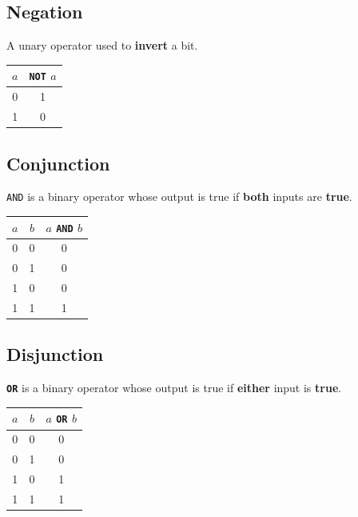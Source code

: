 \documentclass{report}
\newcommand{\keywordinline}[1]{\textcolor[rgb]{0.00,0.50,0.00}{\textbf{\texttt{#1}}}}
\begin{document}
\subsection{Negation}
A unary operator used to \textbf{invert} a bit.
\begin{table}[H]
    \centering
    \begin{tabular}{c c}
        \toprule
        \textbf{\(a\)} & \keywordinline{NOT} \(a\) \\
        \midrule
        0              & 1                         \\
        1              & 0                         \\
        \bottomrule
    \end{tabular}
\end{table}
\subsection{Conjunction}
\texttt{AND} is a binary operator whose output is true if \textbf{both} inputs are \textbf{true}.
\begin{table}[H]
    \centering
    \begin{tabular}{c c c}
        \toprule
        \textbf{\(a\)} & \textbf{\(b\)} & \textbf{\(a\) \texttt{AND} \(b\)} \\
        \midrule
        0              & 0              & 0                                           \\
        0              & 1              & 0                                           \\
        1              & 0              & 0                                           \\
        1              & 1              & 1                                           \\
        \bottomrule
    \end{tabular}
\end{table}
\subsection{Disjunction}
\keywordinline{OR} is a binary operator whose output is true if \textbf{either} input is \textbf{true}.
\begin{table}[H]
    \centering
    \begin{tabular}{c c c}
        \toprule
        \textbf{\(a\)} & \textbf{\(b\)} & \(a\) \keywordinline{OR} \(b\) \\
        \midrule
        0              & 0              & 0                              \\
        0              & 1              & 0                              \\
        1              & 0              & 1                              \\
        1              & 1              & 1                              \\
        \bottomrule
    \end{tabular}
\end{table}
\end{document}
